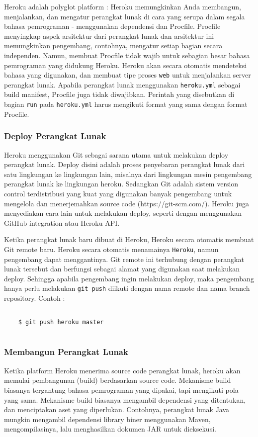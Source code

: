 Heroku adalah polyglot platform : Heroku memungkinkan Anda membangun, menjalankan, dan mengatur perangkat lunak di cara yang serupa dalam segala bahasa pemrograman - menggunakan dependensi dan Procfile. Procfile menyingkap aspek arsitektur dari perangkat lunak dan arsitektur ini memungkinkan pengembang, contohnya, mengatur setiap bagian secara independen. Namun, membuat Procfile tidak wajib untuk sebagian besar bahasa pemrograman yang didukung Heroku. Heroku akan secara otomatis mendeteksi bahasa yang digunakan, dan membuat tipe proses \texttt{web} untuk menjalankan server perangkat lunak. Apabila perangkat lunak menggunakan \texttt{heroku.yml} sebagai build manifest, Procfile juga tidak diwajibkan. Perintah yang disebutkan di bagian \texttt{run} pada \texttt{heroku.yml} harus mengikuti format yang sama dengan format Procfile.

\subsubsection{Deploy Perangkat Lunak}
Heroku menggunakan Git sebagai sarana  utama untuk melakukan deploy perangkat lunak. Deploy disini adalah proses penyebaran perangkat lunak dari satu lingkungan ke lingkungan lain, misalnya dari lingkungan mesin pengembang perangkat lunak ke lingkungan heroku. Sedangkan Git adalah sistem version control terdistribusi yang kuat yang digunakan banyak pengembang untuk mengelola dan menerjemahkan source code (https://git-scm.com/). Heroku juga menyediakan cara lain untuk melakukan deploy, seperti dengan menggunakan GitHub integration atau Heroku API.  

Ketika perangkat lunak baru dibuat di Heroku, Heroku secara otomatis membuat Git remote baru. Heroku secara otomatis menamainya \texttt{Heroku}, namun pengembang dapat menggantinya. Git remote ini terhubung dengan perangkat lunak tersebut dan berfungsi sebagai alamat yang digunakan saat melakukan deploy. Sehingga apabila pengembang ingin melakukan deploy, maka pengembang hanya perlu melakukan \texttt{git push} diikuti dengan nama remote dan nama branch repository. Contoh :
\begin{lstlisting}

	$ git push heroku master
	
\end{lstlisting}

\subsubsection{Membangun Perangkat Lunak}
Ketika platform Heroku menerima source code perangkat lunak, heroku akan memulai pembangunan (build) berdasarkan source code. Mekanisme build biasanya tergantung bahasa pemrograman yang dipakai, tapi mengikuti pola yang sama. Mekanisme build biasanya mengambil dependensi yang ditentukan, dan menciptakan aset yang diperlukan. Contohnya, perangkat lunak Java mungkin mengambil dependensi library biner menggunakan Maven, mengompilasinya, lalu menghasilkan dokumen JAR untuk dieksekusi.

